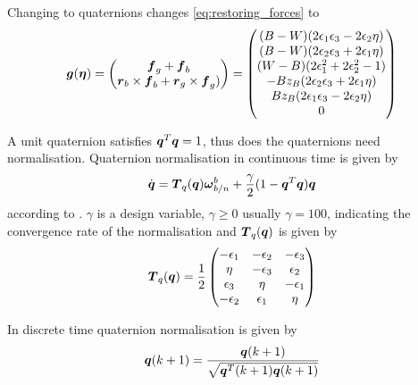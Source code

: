 Changing to quaternions changes \eqref{eq:restoring_forces} to 
\begin{equation}
    \boldsymbol{g}(\boldsymbol{\eta}) = 
    \begin{pmatrix}
    \boldsymbol{f}_g + \boldsymbol{f}_b \\
    \boldsymbol{r}_b \times \boldsymbol{f}_b + \boldsymbol{r}_g \times \boldsymbol{f}_g) 
     \end{pmatrix} = 
    \begin{pmatrix}
	(B - W) (2 \epsilon_1 \epsilon_3 - 2 \epsilon_2 \eta) 	\\
    (B - W) (2 \epsilon_2 \epsilon_3 + 2 \epsilon_1 \eta) 	\\
 	(W - B)(2 \epsilon_1^2 + 2\epsilon_2^2 - 1)				\\
 	-B z_B (2 \epsilon_2 \epsilon_3 + 2 \epsilon_1 \eta)	\\
  	B z_B (2 \epsilon_1 \epsilon_3 - 2 \epsilon_2 \eta)		\\
    0
    \end{pmatrix}
\end{equation}

A unit quaternion satisfies $\boldsymbol{q}^T\boldsymbol{q} = 1$, thus does the quaternions need normalisation.
Quaternion normalisation in continuous time is given by 
\begin{equation}
\dot{\boldsymbol{q}} = \boldsymbol{T}_q(\boldsymbol{q}) \boldsymbol{\omega}^b_{b/n} + \frac{\gamma}{2} ( 1 - \boldsymbol{q}^T\boldsymbol{q})\boldsymbol{q}
\end{equation}
according to \citet[31]{fossen2011}. $\gamma$ is a design variable, $\gamma \geq 0$ usually $\gamma = 100$, indicating the convergence rate of the normalisation and $\boldsymbol{T}_q(\boldsymbol{q})$ is given by
\begin{equation} \label{eq:Tquat}
\boldsymbol{T}_q(\boldsymbol{q}) = \frac{1}{2}
\begin{pmatrix}
-\epsilon_1  & -\epsilon_2  & -\epsilon_3 \\
\eta   & -\epsilon_3 & \epsilon_2 \\
\epsilon_3 & \eta    &  -\epsilon_1 \\
-\epsilon_2 & \epsilon_1    & \eta \\
\end{pmatrix}
\end{equation}

In discrete time quaternion normalisation is given by 
\begin{equation}
\boldsymbol{q}(k+1) = \frac{\boldsymbol{q}(k+1)}{\sqrt{\boldsymbol{q}^T(k+1)\boldsymbol{q}(k+1)}}
\end{equation}

